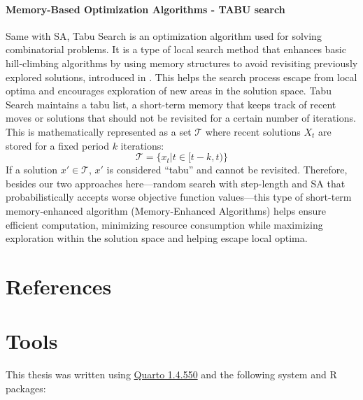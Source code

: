 \documentclass[
  a4paper,
  oneside,
  openany,
  12pt,
  onecolumn]{book}
\theoremstyle{definition}
\theoremstyle{definition}
\theoremstyle{plain}
\theoremstyle{remark}
\begin{document}
\subsubsection{Memory-Based Optimization Algorithms - TABU
search}\label{memory-based-optimization-algorithms---tabu-search}

Same with SA, Tabu Search is an optimization algorithm used for solving
combinatorial problems. It is a type of local search method that
enhances basic hill-climbing algorithms by using memory structures to
avoid revisiting previously explored solutions, introduced in
\citet{butler2013model}. This helps the search process escape from local
optima and encourages exploration of new areas in the solution space.
Tabu Search maintains a tabu list, a short-term memory that keeps track
of recent moves or solutions that should not be revisited for a certain
number of iterations. This is mathematically represented as a set
\(\mathcal{T}\) where recent solutions \(X_t\) are stored for a fixed
period \(k\) iterations: \[
\mathcal{T} = \{x_t|t \in [t-k,t)\}
\] If a solution \(x' \in \mathcal{T}\), \(x'\) is considered ``tabu''
and cannot be revisited. Therefore, besides our two approaches
here---random search with step-length and SA that probabilistically
accepts worse objective function values---this type of short-term
memory-enhanced algorithm (Memory-Enhanced Algorithms) helps ensure
efficient computation, minimizing resource consumption while maximizing
exploration within the solution space and helping escape local optima.


\chapter*{References}\label{references}


\renewcommand{\bibsection}{}


\cleardoublepage
{}
{}
\appendix

\chapter{Tools}\label{sec-tools}

This thesis was written using \href{https://quarto.org/}{Quarto 1.4.550}
\citep{quarto} and the following system and R packages:
\end{document}
